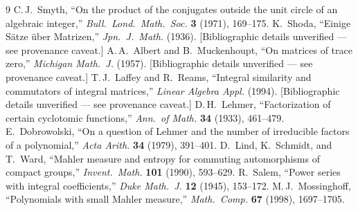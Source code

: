 \documentclass[11pt]{article}
\theoremstyle{plain}
\theoremstyle{definition}
\theoremstyle{remark}
\begin{document}
\begin{thebibliography}{9}
 C.\,J.~Smyth, ``On the product of the conjugates outside the unit circle of an algebraic integer,'' \emph{Bull.\ Lond.\ Math.\ Soc.} \textbf{3} (1971), 169--175.
 K.~Shoda, ``Einige S\"atze \"uber Matrizen,'' \emph{Jpn.\ J.\ Math.} (1936). [Bibliographic details unverified --- see provenance caveat.]
 A.\,A.~Albert and B.~Muckenhoupt, ``On matrices of trace zero,'' \emph{Michigan Math.\ J.} (1957). [Bibliographic details unverified --- see provenance caveat.]
 T.\,J.~Laffey and R.~Reams, ``Integral similarity and commutators of integral matrices,'' \emph{Linear Algebra Appl.} (1994). [Bibliographic details unverified --- see provenance caveat.]
 D.\,H.~Lehmer, ``Factorization of certain cyclotomic functions,'' \emph{Ann.\ of Math.} \textbf{34} (1933), 461--479.
 E.~Dobrowolski, ``On a question of Lehmer and the number of irreducible factors of a polynomial,'' \emph{Acta Arith.} \textbf{34} (1979), 391--401.
 D.~Lind, K.~Schmidt, and T.~Ward, ``Mahler measure and entropy for commuting automorphisms of compact groups,'' \emph{Invent.\ Math.} \textbf{101} (1990), 593--629.
 R.~Salem, ``Power series with integral coefficients,'' \emph{Duke Math.\ J.} \textbf{12} (1945), 153--172.
 M.\,J.~Mossinghoff, ``Polynomials with small Mahler measure,'' \emph{Math.\ Comp.} \textbf{67} (1998), 1697--1705.
\end{thebibliography}
\end{document}
